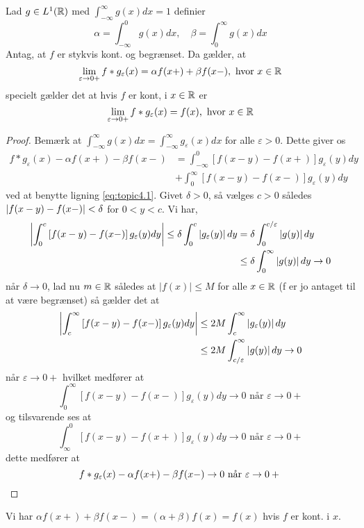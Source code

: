 \begin{theorem}
  Lad $g \in L^{1}(\mathbb{R})$ med $\int_{-\infty}^{\infty} g(x) dx = 1$ definier
  \begin{equation*}
    \alpha = \int_{-\infty}^{0} g(x) dx, \quad \beta = \int_0^{\infty} g(x) dx
  \end{equation*}
  Antag, at $f$ er stykvis kont. og begrænset. Da gælder, at
  \begin{equation*}
    \lim_{\varepsilon \to 0+} f * g_{\varepsilon}(x) = \alpha f(x+) + \beta f(x-), \text{ hvor } x \in \mathbb{R}
  \end{equation*}
  specielt gælder det at hvis $f$ er kont, i $x \in \mathbb{R}$ er
  \begin{equation*}
    \lim_{\varepsilon \to 0+} f * g_{\varepsilon}(x) = f(x), \text{ hvor } x \in \mathbb{R}
  \end{equation*}
\end{theorem}
\begin{proof}
  Bemærk at $\displaystyle \int_{-\infty}^{\infty} g(x) dx = \int_{-\infty}^{\infty} g_{\varepsilon}(x) dx$ for alle $\varepsilon > 0$. Dette giver os
  \begin{align*}
    f * g_{\varepsilon}(x) - \alpha f(x+) - \beta f(x-) &= \int_{-\infty}^0 \left[f(x - y)-f(x+)\right] g_{\varepsilon}(y) dy \\ &+ \int_0^{\infty} \left[f(x - y) - f(x-)\right] g_{\varepsilon}(y) dy
  \end{align*}
  ved at benytte ligning \eqref{eq:topic4.1}.
  Givet $\delta > 0$, så vælges $c > 0$ således $\left|f(x-y)-f(x-)\right| < \delta$ for $0 < y < c$. Vi har,
  \begin{align*}
    \left|\int_0^c \left[f(x - y) - f(x-)\right] g_{\varepsilon}(y) dy \right| \leq \delta \int_0^c \left|g_{\varepsilon}(y)\right| dy &= \delta \int_{0}^{c/\varepsilon} \left|g(y)\right| dy \\
   &\leq \delta\int_0^{\infty} \left|g(y)\right| dy \to 0
  \end{align*}
  når $\delta \to 0$, lad nu $m \in \mathbb{R}$ således at $|f(x)| \leq M$ for alle $x \in \mathbb{R}$ (f er jo antaget til at være begrænset) så gælder det at
  \begin{align*}
    \left|\int_c^{\infty} \left[f(x - y) - f(x-)\right] g_{\varepsilon}(y) dy \right| &\leq 2M \int_{c}^{\infty} \left|g_{\varepsilon}(y)\right| dy \\ &\leq 2M \int_{c / \varepsilon}^{\infty} \left|g(y)\right| dy \to 0
  \end{align*}
  når $\varepsilon \to 0+$ hvilket medfører at
  \begin{equation*}
    \int_0^{\infty} \left[f(x - y) - f(x-)\right] g_{\varepsilon}(y) dy \to 0 \text{ når } \varepsilon \to 0+
  \end{equation*}
  og tilsvarende ses at
  \begin{equation*}
    \int_\infty^{0} \left[f(x - y) - f(x+)\right] g_{\varepsilon}(y) dy \to 0 \text{ når } \varepsilon \to 0+
  \end{equation*}
  dette medfører at
  \begin{equation*}
    f * g_{\varepsilon}(x) - \alpha f(x+) - \beta f(x-) \to 0 \text{ når } \varepsilon \to 0+ \qedhere
  \end{equation*}
\end{proof}
\begin{remark}
  Vi har $\alpha f(x+) + \beta f(x-) = (\alpha + \beta) f(x) = f(x)$ hvis $f$ er kont. i $x$.
\end{remark}

